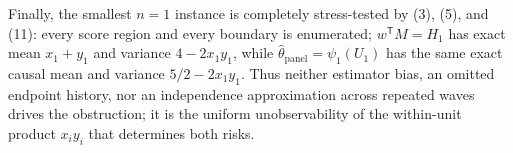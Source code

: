 Finally, the smallest \(n=1\) instance is completely stress-tested by (3), (5), and (11): every score region and every boundary is enumerated; \(w^{\mathsf T}M=H_1\) has exact mean \(x_1+y_1\) and variance \(4-2x_1y_1\), while \(\widehat\theta_{\mathrm{panel}}=\psi_1(U_1)\) has the same exact causal mean and variance \(5/2-2x_1y_1\).  Thus neither estimator bias, an omitted endpoint history, nor an independence approximation across repeated waves drives the obstruction; it is the uniform unobservability of the within-unit product \(x_i y_i\) that determines both risks.